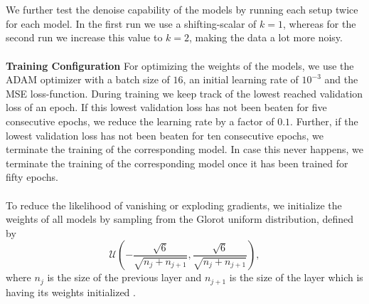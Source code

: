 \documentclass[./main.tex]{subfiles}
\begin{document}
\\
\\
We further test the denoise capability of the models by running each setup twice for each model. In the first run we use a shifting-scalar of $k = 1$, whereas for the second run we increase this value to $k = 2$, making the data a lot more noisy.
\\
\\
\textbf{Training Configuration} For optimizing the weights of the models, we use the ADAM optimizer with a batch size of $16$, an initial learning rate of $10^{-3}$ and the MSE loss-function. During training we keep track of the lowest reached validation loss of an epoch. If this lowest validation loss has not been beaten for five consecutive epochs, we reduce the learning rate by a factor of $0.1$. Further, if the lowest validation loss has not been beaten for ten consecutive epochs, we terminate the training of the corresponding model. In case this never happens, we terminate the training of the corresponding model once it has been trained for fifty epochs.
\\
\\
To reduce the likelihood of vanishing or exploding gradients, we initialize the weights of all models by sampling from the Glorot uniform distribution, defined by
\begin{equation}
    \mathcal{U} \left(- \frac{\sqrt{6}}{\sqrt{n_j + n_{j + 1}}}, \frac{\sqrt{6}}{\sqrt{n_j + n_{j + 1}}} \right),
\end{equation}
where $n_j$ is the size of the previous layer and $n_{j + 1}$ is the size of the layer which is having its weights initialized \cite{glorot2010understanding}.
\end{document}

